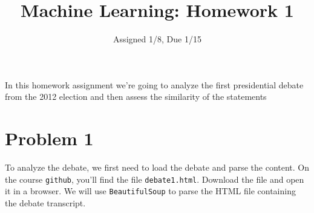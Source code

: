 \documentclass[12pt,letterpaper]{article}
\title{Machine Learning: Homework 1}
\date{Assigned 1/8, Due 1/15}
\begin{document}
\maketitle


In this homework assignment we're going to analyze the first presidential debate from the 2012 election and then assess the similarity of the statements  \\

\section*{Problem 1}
To analyze the debate, we first need to load the debate and parse the content.  On the course {\tt github}, you'll find the file {\tt debate1.html}.  Download the file and open it in a browser. We will use {\tt BeautifulSoup} to parse the HTML file containing the debate transcript.
\end{document}
